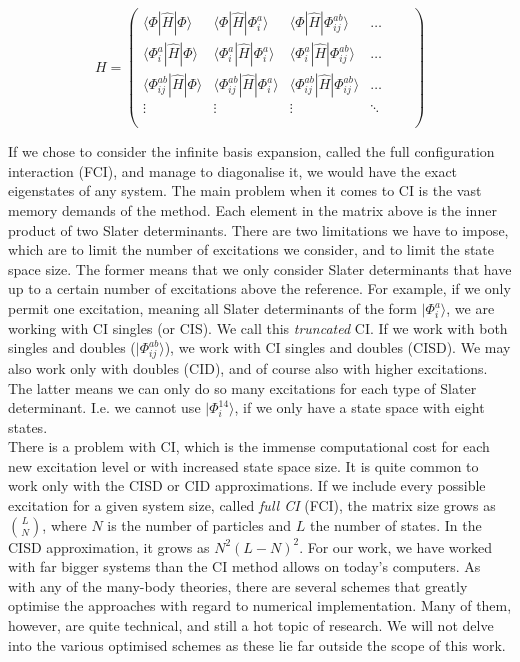 \documentclass[10pt,twoside]{report}
\begin{document}
	\begin{equation}
	H = \begin{pmatrix}
	\langle\Phi|\hat{H}|\Phi\rangle & \langle\Phi|\hat{H}|\Phi_i^a\rangle & \langle\Phi|\hat{H}|\Phi_{ij}^{ab}\rangle & \ldots\\
	\langle\Phi_i^a|\hat{H}|\Phi\rangle & \langle\Phi_i^a|\hat{H}|\Phi_i^a\rangle & \langle\Phi_i^a|\hat{H}|\Phi_{ij}^{ab}\rangle & \ldots\\
	\langle\Phi_{ij}^{ab}|\hat{H}|\Phi\rangle & \langle\Phi_{ij}^{ab}|\hat{H}|\Phi_i^a\rangle & \langle\Phi_{ij}^{ab}|\hat{H}|\Phi_{ij}^{ab}\rangle & \ldots & \quad\\
	\vdots & \vdots & \vdots & \ddots\\
	\\
	\end{pmatrix}
	\end{equation}
	
	If we chose to consider the infinite basis expansion, called the full configuration interaction (FCI), and manage to diagonalise it, we would have the exact eigenstates of any system. The main problem when it comes to CI is the vast memory demands of the method. Each element in the matrix above is the inner product of two Slater determinants. There are two limitations we have to impose, which are to limit the number of excitations we consider, and to limit the state space size. The former means that we only consider Slater determinants that have up to a certain number of excitations above the reference. For example, if we only permit one excitation, meaning all Slater determinants of the form $|\Phi_i^a\rangle$, we are working with CI singles (or CIS). We call this \emph{truncated} CI. If we work with both singles and doubles ($|\Phi_{ij}^{ab}\rangle$), we work with CI singles and doubles (CISD). We may also work only with doubles (CID), and of course also with higher excitations. The latter means we can only do so many excitations for each type of Slater determinant. I.e. we cannot use $|\Phi_i^{14}\rangle$, if we only have a state space with eight states.\\
	
	There is a problem with CI, which is the immense computational cost for each new excitation level or with increased state space size. It is quite common to work only with the CISD or CID approximations. If we include every possible excitation for a given system size, called \emph{full CI} (FCI), the matrix size grows \cite{Kvaal15} as $\binom{L}{N}$, where $N$ is the number of particles and $L$ the number of states. In the CISD approximation, it grows as $N^2(L-N)^2$. For our work, we have worked with far bigger systems than the CI method allows on today's computers. As with any of the many-body theories, there are several schemes that greatly optimise the approaches with regard to numerical implementation. Many of them, however, are quite technical, and still a hot topic of research. We will not delve into the various optimised schemes as these lie far outside the scope of this work.
	
\end{document}
